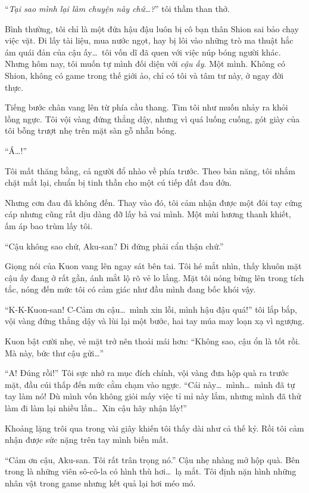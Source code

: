 \documentclass[../main.tex]{subfiles}
\begin{document}
``\textit{Tại sao mình lại làm chuyện này chứ\dots?}'' tôi thầm than thở.

Bình thường, tôi chỉ là một đứa hậu đậu luôn bị cô bạn thân Shion sai bảo chạy việc vặt. Đi lấy tài liệu, mua nước ngọt, hay bị lôi vào những trò ma thuật hắc ám quái đản của cậu ấy\dots\ tôi vốn dĩ đã quen với việc núp bóng người khác. Nhưng hôm nay, tôi muốn tự mình đối diện với \emph{cậu ấy}. Một mình. Không có Shion, không có game trong thế giới ảo, chỉ có tôi và tâm tư này, ở ngay đời thực.

Tiếng bước chân vang lên từ phía cầu thang. Tim tôi như muốn nhảy ra khỏi lồng ngực. Tôi vội vàng đứng thẳng dậy, nhưng vì quá luống cuống, gót giày của tôi bỗng trượt nhẹ trên mặt sàn gỗ nhẵn bóng.

``Á\dots!''

Tôi mất thăng bằng, cả người đổ nhào về phía trước. Theo bản năng, tôi nhắm chặt mắt lại, chuẩn bị tinh thần cho một cú tiếp đất đau đớn.

Nhưng cơn đau đã không đến. Thay vào đó, tôi cảm nhận được một đôi tay cứng cáp nhưng cũng rất dịu dàng đỡ lấy bả vai mình. Một mùi hương thanh khiết, ấm áp bao trùm lấy tôi.

``Cậu không sao chứ, Aku-san? Đi đứng phải cẩn thận chứ.''

Giọng nói của Kuon vang lên ngay sát bên tai. Tôi hé mắt nhìn, thấy khuôn mặt cậu ấy đang ở rất gần, ánh mắt lộ rõ vẻ lo lắng. Mặt tôi nóng bừng lên trong tích tắc, nóng đến mức tôi có cảm giác như đầu mình đang bốc khói vậy.

``K-K-Kuon-san! C-Cảm ơn cậu\dots\ mình xin lỗi, mình hậu đậu quá!'' tôi lắp bắp, vội vàng đứng thẳng dậy và lùi lại một bước, hai tay múa may loạn xạ vì ngượng.

Kuon bật cười nhẹ, vẻ mặt trở nên thoải mái hơn: ``Không sao, cậu ổn là tốt rồi. Mà này, bức thư cậu gửi\dots''

``A! Đúng rồi!'' Tôi sực nhớ ra mục đích chính, vội vàng đưa hộp quà ra trước mặt, đầu cúi thấp đến mức cằm chạm vào ngực. ``Cái này\dots\ mình\dots\ mình đã tự tay làm nó! Dù mình vốn không giỏi mấy việc tỉ mỉ này lắm, nhưng mình đã thử làm đi làm lại nhiều lần\dots\ Xin cậu hãy nhận lấy!''

Khoảng lặng trôi qua trong vài giây khiến tôi thấy dài như cả thế kỷ. Rồi tôi cảm nhận được sức nặng trên tay mình biến mất.

``Cảm ơn cậu, Aku-san. Tôi rất trân trọng nó.'' Cậu nhẹ nhàng mở hộp quà. Bên trong là những viên sô-cô-la có hình thù hơi\dots\ lạ mắt. Tôi định nặn hình những nhân vật trong game nhưng kết quả lại hơi méo mó.
\end{document}

